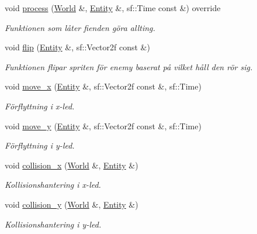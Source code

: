 \begin{DoxyCompactItemize}
void \hyperlink{classEnemy__Behaviour_a19097e215910b3fd8cf9e002a6f7f642}{process} (\hyperlink{classWorld}{World} \&, \hyperlink{classEntity}{Entity} \&, sf\+::\+Time const \&) override
\begin{DoxyCompactList}\small\item\em Funktionen som låter fienden göra allting. \end{DoxyCompactList}\item 
void \hyperlink{classEnemy__Behaviour_a539ca31dbfab9b02933d6c8ad53b6899}{flip} (\hyperlink{classEntity}{Entity} \&, sf\+::\+Vector2f const \&)
\begin{DoxyCompactList}\small\item\em Funktionen flipar spriten för enemy baserat på vilket håll den rör sig. \end{DoxyCompactList}\item 
void \hyperlink{classEnemy__Behaviour_a4c16df5a815e62dcc41450a997d45cbb}{move\+\_\+x} (\hyperlink{classEntity}{Entity} \&, sf\+::\+Vector2f const \&, sf\+::\+Time)
\begin{DoxyCompactList}\small\item\em Förflyttning i x-\/led. \end{DoxyCompactList}\item 
void \hyperlink{classEnemy__Behaviour_a2793ee5dfc35eff84ba7894619dec0ef}{move\+\_\+y} (\hyperlink{classEntity}{Entity} \&, sf\+::\+Vector2f const \&, sf\+::\+Time)
\begin{DoxyCompactList}\small\item\em Förflyttning i y-\/led. \end{DoxyCompactList}\item 
void \hyperlink{classEnemy__Behaviour_a33b00ea5e572f8084f48891c0f951048}{collision\+\_\+x} (\hyperlink{classWorld}{World} \&, \hyperlink{classEntity}{Entity} \&)
\begin{DoxyCompactList}\small\item\em Kollisionshantering i x-\/led. \end{DoxyCompactList}\item 
void \hyperlink{classEnemy__Behaviour_a67c1e90d31e938cd6a064064a5f97fbc}{collision\+\_\+y} (\hyperlink{classWorld}{World} \&, \hyperlink{classEntity}{Entity} \&)
\begin{DoxyCompactList}\small\item\em Kollisionshantering i y-\/led. \end{DoxyCompactList}\end{DoxyCompactItemize}
